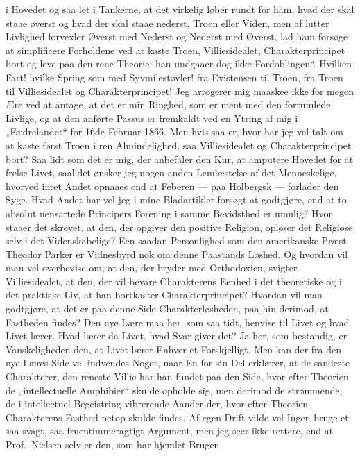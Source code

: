i Hovedet og saa let i Tankerne, at det virkelig løber rundt for ham, hvad der
skal staae øverst og hvad der skal staae nederst, Troen eller Viden, men af
lutter Livlighed forvexler Øverst med Nederst og Nederst med Øverst, lad ham
forsøge at simplificere Forholdene ved at kaste Troen, Villiesidealet,
Charakterprincipet bort og leve paa den rene Theorie: han undgaaer dog ikke
Fordoblingen“. Hvilken Fart! hvilke Spring som med Syvmilestøvler! fra
Existensen til Troen, fra Troen til Villiesidealet og Charakterprincipet! Jeg
arrogerer mig maaskee ikke for megen Ære ved at antage, at det er min Ringhed,
som er ment med den fortumlede Livlige, og at den anførte Passus er fremkaldt
ved en Ytring af mig i „Fædrelandet“ for 16de Februar 1866. Men hvis saa er,
hvor har jeg vel talt om at kaste først Troen i ren Almindelighed, saa
Villiesidealet og Charakterprincipet bort? Saa lidt som det er mig, der
anbefaler den Kur, at amputere Hovedet for at frelse Livet, saalidet ønsker
jeg nogen anden Lemlæstelse af det Menneskelige, hvorved intet Andet opnaaes
end at Feberen --- paa Holbergsk --- forlader den Syge. Hvad Andet har vel jeg
i mine Bladartikler forsøgt at godtgjøre, end at to absolut uensartede
Principers Forening i samme Bevidsthed er umulig? Hvor staaer det skrevet, at
den, der opgiver den positive Religion,
opløser det Religiøse selv i det Videnskabelige? Een saadan
Personlighed som den amerikanske Præst Theodor Parker er Vidnesbyrd nok om
denne Paastands Løshed. Og hvordan vil man vel overbevise om, at den, der
bryder med Orthodoxien, svigter Villiesidealet, at den, der vil bevare
Charakterens Eenhed i det theoretiske og i det praktiske Liv, at han
bortkaster Charakterprincipet? Hvordan vil man godtgjøre, at det er paa denne
Side Charakterløsheden, paa hin derimod, at Fastheden findes? Den nye Lære maa
her, som saa tidt, henvise til Livet og hvad Livet lærer. Hvad lærer da Livet,
hvad Svar giver det? Ja her, som bestandig, er Vanskeligheden den, at Livet
lærer Enhver et Forskjelligt. Men kan der fra den nye Læres Side vel indvendes
Noget, naar En for sin Del erklærer, at de sandeste Charakterer, den reneste
Villie har han fundet paa den Side, hvor efter Theorien de „intellectuelle
Amphibier“ skulde opholde sig, men derimod de strømmende, de i intellectuel
Begeistring vibrerende Aander der, hvor efter Theorien Charakterens Fasthed
netop skulde findes. Af egen Drift vilde vel Ingen bruge et saa svagt, saa
fruentimmeragtigt Argument, men jeg seer ikke rettere, end at Prof.\ Nielsen
selv er den, som har hjemlet Brugen.

